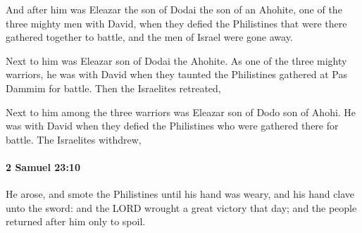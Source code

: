 			\begin{versebox}
					\item[BHS] 
					\item[ASV] And after him was Eleazar the son of Dodai the son of an Ahohite, one of the three mighty men with David, when they defied the Philistines that were there gathered together to battle, and the men of Israel were gone away.
					\item[NIV] Next to him was Eleazar son of Dodai the Ahohite. As one of the three mighty warriors, he was with David when they taunted the Philistines gathered at Pas Dammim for battle. Then the Israelites retreated,
					\item[NRSV] Next to him among the three warriors was Eleazar son of Dodo son of Ahohi. He was with David when they defied the Philistines who were gathered there for battle. The Israelites withdrew,
			\end{versebox}

		\paragraph{2 Samuel 23:10} %
			\label{2SAMUEL-23-10}

			He arose, and smote the Philistines until his hand was weary, and his hand clave unto the sword: and the LORD wrought a great victory that day; and the people returned after him only to spoil.

